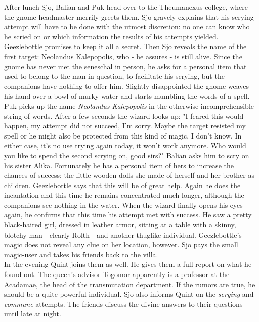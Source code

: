 After lunch Sjo, Balian and Puk head over to the Theumanexus college, where the gnome headmaster merrily greets them. Sjo gravely explains that his scrying attempt will have to be done with the utmost discretion: no one can know who he scried on or which information the results of his attempts yielded. Geezlebottle promises to keep it all a secret. Then Sjo reveals the name of the first target: Neolandus Kalepopolis, who - he assures - is still alive. Since the gnome has never met the seneschal in person, he asks for a personal item that used to belong to the man in question, to facilitate his scrying, but the companions have nothing to offer him. Slightly disappointed the gnome weaves his hand over a bowl of murky water and starts mumbling the words of a spell. Puk picks up the name {\itshape Neolandus Kalepopolis} in the otherwise incomprehensible string of words. After a few seconds the wizard looks up: "I feared this would happen, my attempt did not succeed, I'm sorry. Maybe the target resisted my spell or he might also be protected from this kind of magic, I don't know. In either case, it's no use trying again today, it won't work anymore. Who would you like to spend the second scrying on, good sirs?" Balian asks him to scry on his sister Alika. Fortunately he has a personal item of hers to increase the chances of success: the little wooden dolls she made of herself and her brother as children. Geezlebottle says that this will be of great help. Again he does the incantation and this time he remains concentrated much longer, although the companions see nothing in the water. When the wizard finally opens his eyes again, he confirms that this time his attempt met with success. He saw a pretty black-haired girl, dressed in leather armor, sitting at a table with a skinny, blotchy man - clearly Rolth - and another thuglike individual. Geezlebottle's magic does not reveal any clue on her location, however. Sjo pays the small magic-user and takes his friends back to the villa.\\

In the evening Quint joins them as well. He gives them a full report on what he found out. The queen's advisor Togomor apparently is a professor at the Acadamae, the head of the transmutation department. If the rumors are true, he should be a quite powerful individual. Sjo also informs Quint on the {\itshape scrying} and  {\itshape commune} attempts. The friends discuss the divine answers to their questions until late at night. 